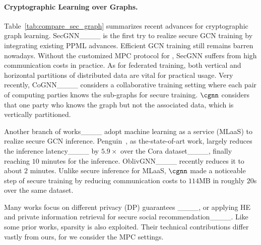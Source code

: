  

\paragraph{Cryptographic Learning over Graphs.}
Table~\ref{tab:compare_sec_graph} summarizes recent advances for cryptographic graph learning. 
SecGNN____ is the first try to realize secure GCN training %
by integrating existing PPML advances.
Efficient GCN training still remains barren nowadays.
Without the customized MPC protocol for \osmm, %
SecGNN suffers from high communication costs in practice.
As for federated training, both vertical and horizontal partitions of distributed data are vital for practical usage.
Very recently, CoGNN____ considers a collaborative training setting where each pair of computing parties knows the sub-graphs for secure training.
$\cgnn$ considers that one party who knows the graph but not the associated data, which is vertically partitioned.

Another branch of works____ adopt machine learning as a service (MLaaS) to realize secure GCN inference.
Penguin~\cite[Table 3]{nips/RanXLWQW23}, as the-state-of-art work, largely reduces the inference latency____ by $5.9\times$ over the Cora dataset____, finally reaching $10$ minutes for the inference.
OblivGNN____ recently reduces it to about $2$ minutes.
Unlike secure inference for MLaaS, $\cgnn$ made a noticeable step of secure training by reducing communication costs to $114$MB in roughly $20$s over the same dataset.


Many works focus on different privacy (DP) guarantees%
____,
or %
applying HE and private information retrieval for secure social recommendation____.
Like some prior works, sparsity is also exploited.
Their technical contributions differ vastly from ours, for we consider %
the MPC settings.